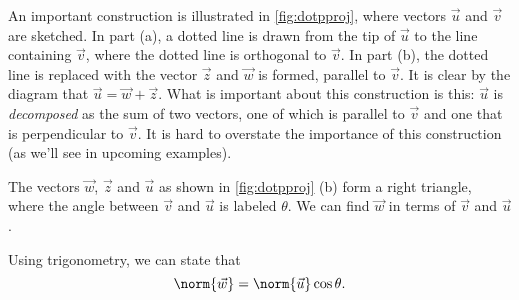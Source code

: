 
An important construction is illustrated in \autoref{fig:dotpproj}, where vectors $\vec u$ and $\vec v$ are sketched. In part (a), a dotted line is drawn from the tip of $\vec u$ to the line containing $\vec v$, where the dotted line is orthogonal to $\vec v$. In part (b), the dotted line is replaced with the vector $\vec z$ and  $\vec w$ is formed, parallel to $\vec v$. It is clear by the diagram that $\vec u = \vec w+\vec z$. What is important about this construction is this: $\vec u$ is \emph{decomposed} as the sum of two vectors, one of which is parallel to $\vec v$ and one that is perpendicular to $\vec v$. It is hard to overstate the importance of this construction (as we'll see in upcoming examples). 

The vectors $\vec w$, $\vec z$ and $\vec u$ as shown in \autoref{fig:dotpproj} (b) form a right triangle, where the angle between $\vec v$ and $\vec u$ is labeled $\theta$. We can find $\vec w$ in terms of $\vec v$ and $\vec u$.

Using trigonometry, we can state that 
\begin{equation}
\norm{\vec w} = \norm{\vec u}\cos \theta. \label{eq:proj1}
\end{equation}


